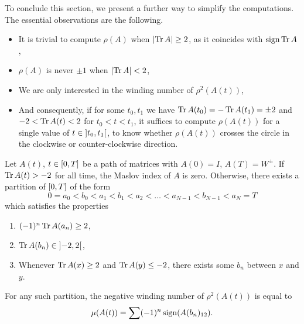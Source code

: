 To conclude this section, we present a further way to simplify the computations. The essential observations are the following.
\begin{itemize}
\item It is trivial to compute $\rho(A)$ when $\lvert\operatorname{Tr} A\rvert \geq 2$, as it coincides with $\operatorname{sign} \operatorname{Tr} A$,
\item $\rho(A)$ is never $\pm 1$ when $\lvert\operatorname{Tr} A\rvert < 2$,
\item We are only interested in the winding number of $\rho^2(A(t))$,
\item And consequently, if for some $t_0, t_1$ we have $\operatorname{Tr} A(t_0) = - \operatorname{Tr} A(t_1) = \pm 2$ and $-2 < \operatorname{Tr} A(t) < 2$ for $t_0 < t < t_1$, it suffices to compute $\rho(A(t))$ for a single value of $t \in \ointerval{t_0}{t_1}$, to know whether $\rho(A(t))$ crosses the circle in the clockwise or counter-clockwise direction.
\end{itemize}

\begin{prop}\label{calcmaslov0}
Let $A(t)$, $t \in \interval 0 T$ be a path of matrices with $A(0) = I$, $A(T) = W^\pm$. If $\operatorname{Tr} A(t) > -2$ for all time, the Maslov index of $A$ is zero. Otherwise, there exists a partition of $\interval 0 T$ of the form
\begin{equation}\label{calcmaslov:ab1}
0 = a_0 < b_0 < a_1 < b_1 < a_2 < \dots < a_{N-1} < b_{N-1} < a_N = T
\end{equation}
which satisfies the properties
\begin{enumerate}
\item\label{calcmaslov:ab2} $(-1)^n \operatorname{Tr} A(a_n) \geq 2$, \item\label{calcmaslov:ab3} $\trace A(b_n) \in \ointerval{-2}2$, \item\label{calcmaslov:ab4} Whenever $\operatorname{Tr} A(x) \geq 2$ and $\operatorname{Tr} A(y) \leq -2$, there exists some $b_n$ between $x$ and $y$.\end{enumerate}

For any such partition, the negative winding number of $\rho^2(A(t))$ is equal to
\begin{equation}\label{calcmaslov0:mu}
\mu(A(t)) = \sum (-1)^n \operatorname{sign}(A(b_n)_{12}).
\end{equation}
\end{prop}

